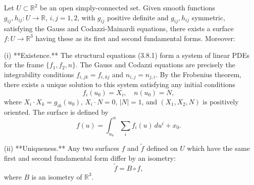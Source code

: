 Let $U \subset \mathbb{R}^2$ be an open simply-connected set. Given smooth functions $g_{ij}, h_{ij}: U \to \mathbb{R}$, $i,j = 1,2$, with $g_{ij}$ positive definite and $g_{ij}, h_{ij}$ symmetric, satisfying the Gauss and Codazzi-Mainardi equations, there exists a surface $f: U \to \mathbb{R}^3$ having these as its first and second fundamental forms. Moreover:

(i) **Existence.** The structural equations (3.8.1) form a system of linear PDEs for the frame $\{f_1, f_2, n\}$. The Gauss and Codazzi equations are precisely the integrability conditions $f_{i,jk} = f_{i,kj}$ and $n_{i,j} = n_{j,i}$. By the Frobenius theorem, there exists a unique solution to this system satisfying any initial conditions
$$f_i(u_0) = X_i, \quad n(u_0) = N,$$
where $X_i \cdot X_k = g_{ik}(u_0)$, $X_i \cdot N = 0$, $|N| = 1$, and $(X_1, X_2, N)$ is positively oriented. The surface is defined by
$$f(u) = \int_{u_0}^{u} \sum_i f_i(u) \, du^i + x_0.$$

(ii) **Uniqueness.** Any two surfaces $f$ and $\tilde{f}$ defined on $U$ which have the same first and second fundamental form differ by an isometry:
$$\tilde{f} = B \circ f,$$
where $B$ is an isometry of $\mathbb{R}^3$.
